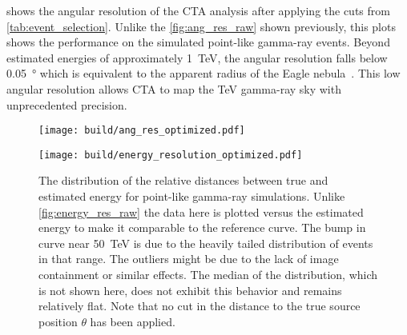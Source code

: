  shows the angular resolution of the CTA analysis after applying the cuts from \cref{tab:event_selection}. 
Unlike the \cref{fig:ang_res_raw} shown previously, this plots shows the performance on the simulated point-like gamma-ray events. 
Beyond estimated energies of approximately \SI{1}{TeV}, the angular resolution falls below \SI{0.05}{\degree} which is equivalent to 
the apparent radius of the Eagle nebula~\cite{objects}. This low angular resolution allows CTA to 
map the \si{TeV} gamma-ray sky with unprecedented precision.
\begin{figure}
    \centering
    \texttt{[image: build/ang\_res\_optimized.pdf]}
    \caption[Angular resolution with optimized event selection]{The distribution of distances between true and estimated source position.
    As discussed for \cref{fig:ang_res_raw} the angular resolution is defined
    as the 68\th percentile of the distance between estimated and simulated source position.
    Unlike \cref{fig:ang_res_raw} the data here is plotted versus 
    estimated energy to make it comparable to the reference curve, which is unfortunately not available in units of true event energy.
    Note that no cut in the distance to the true source position $\theta$ has been applied.
    }
    \label{fig:ang_res_optimized}
    \vspace*{\floatsep}%

    \texttt{[image: build/energy\_resolution\_optimized.pdf]}
    \caption[Energy resolution with optimized event selection]{The distribution of the relative distances between true and estimated energy for point-like gamma-ray simulations.
    Unlike \cref{fig:energy_res_raw} the data here is plotted versus the estimated energy to make it comparable to the reference curve.
    The bump in curve near \SI{50}{TeV} is due to the heavily tailed distribution of events in that range. The outliers might 
    be due to the lack of image containment or similar effects. 
    The median of the distribution, which is not shown here, does not exhibit this behavior and remains relatively flat.
    Note that no cut in the distance to the true source position $\theta$ has been applied.
    }
    \label{fig:energy_res_optimized}
\end{figure}

